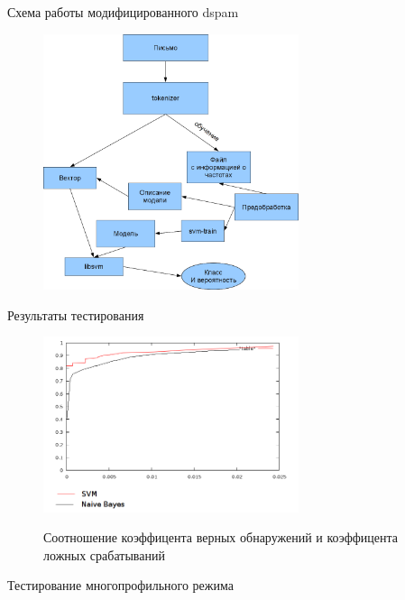 \documentclass{beamer}
\begin{document}
\begin{frame}{Схема работы модифицированного dspam}
\begin{figure}[h]
\begin{center}
    \includegraphics[width=7.5cm]{../img/working_scheme}
\end{center}
\end{figure}
\end{frame}

\begin{frame}{Результаты тестирования}
\begin{figure}[h]
\begin{center}
    \includegraphics[width=7.5cm]{img/graphic}
\end{center}
    Соотношение коэффицента верных обнаружений и коэффицента ложных срабатываний
\end{figure}

\end{frame}

\begin{frame}{Тестирование многопрофильного режима}
\end{frame}




\begin{frame}
\end{frame}
\end{document}
